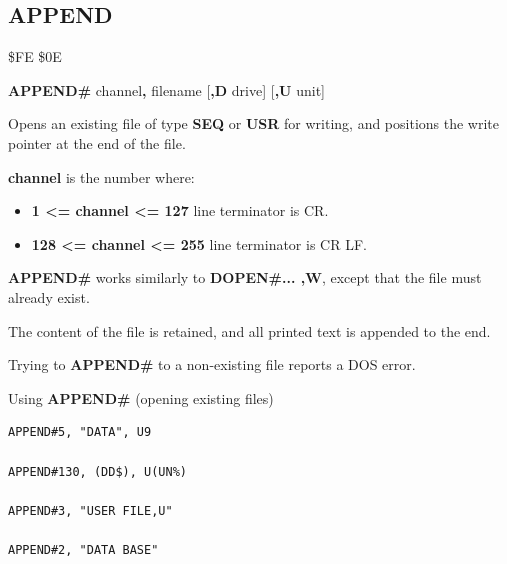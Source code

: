 
\newpage
\subsection{APPEND}
\begin{description}[leftmargin=2cm,style=nextline]
\item [Token:]    \$FE \$0E

\item [Format:]   {\bf APPEND\#} channel{\bf,} filename [{\bf,D} drive] [{\bf,U} unit]

\item [Usage:]    Opens an existing file of type {\bf SEQ} or {\bf USR} for writing, and positions the write pointer at the end of the file.

                  {\bf channel} is the number where:
                  \begin{itemize}
                     \item {\bf 1 <= channel <= 127} line terminator is CR.
                     \item {\bf 128 <= channel <= 255} line terminator is CR LF.
                  \end{itemize}

                  \filenamedefinition

                  \drivedefinition

                  \unitdefinition

\item [Remarks:]  {\bf APPEND\#} works similarly to {\bf DOPEN\#... ,W}, except that the file must already exist.

                  The content of the file is retained, and all printed text is appended to the end.
      
                  Trying to {\bf APPEND\#} to a non-existing file reports a DOS error.

\item [Examples:] Using {\bf APPEND\#} (opening existing files)

\begin{tcolorbox}[colback=black,coltext=white]
\verbatimfont{\codefont}
\begin{verbatim}
APPEND#5, "DATA", U9

APPEND#130, (DD$), U(UN%)

APPEND#3, "USER FILE,U"

APPEND#2, "DATA BASE"
\end{verbatim}
\end{tcolorbox}
\end{description}


